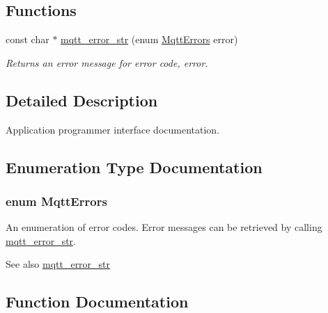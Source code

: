 \subsection*{Functions}
\begin{DoxyCompactItemize}
\item 
const char $\ast$ \hyperlink{group__api_ga6f0b3e9a177b03d5909e4f653fcd4038}{mqtt\+\_\+error\+\_\+str} (enum \hyperlink{group__api_gabfef25ed21446904fd8b3a71cfa1f203}{Mqtt\+Errors} error)
\begin{DoxyCompactList}\small\item\em Returns an error message for error code, {\ttfamily error}. \end{DoxyCompactList}\end{DoxyCompactItemize}


\subsection{Detailed Description}
Application programmer interface documentation. 



\subsection{Enumeration Type Documentation}
\subsubsection[{\texorpdfstring{Mqtt\+Errors}{MqttErrors}}]{\setlength{\rightskip}{0pt plus 5cm}enum {\bf Mqtt\+Errors}}\hypertarget{group__api_gabfef25ed21446904fd8b3a71cfa1f203}{}\label{group__api_gabfef25ed21446904fd8b3a71cfa1f203}


An enumeration of error codes. Error messages can be retrieved by calling \hyperlink{group__api_ga6f0b3e9a177b03d5909e4f653fcd4038}{mqtt\+\_\+error\+\_\+str}. 

\begin{DoxySeeAlso}{See also}
\hyperlink{group__api_ga6f0b3e9a177b03d5909e4f653fcd4038}{mqtt\+\_\+error\+\_\+str} 
\end{DoxySeeAlso}


\subsection{Function Documentation}
